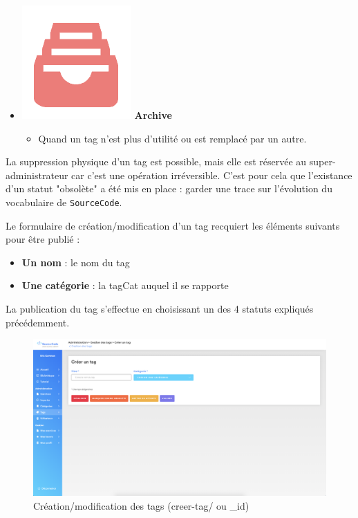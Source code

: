 \begin{itemize}
    \item \includegraphics[valign=b,height=1.4\fontcharht\font`X]{images/client/archive.png} \textbf{Archive}
    \begin{itemize}
        \item Quand un \gls{tag} n'est plus d'utilité ou est remplacé par un autre.
    \end{itemize}
\end{itemize}

La suppression physique d'un \gls{tag} est possible, mais elle est réservée au super-administrateur car c'est une opération irréversible. C'est pour cela que l'existance d'un statut "obsolète" a été mis en place : garder une trace sur l'évolution du vocabulaire de \texttt{SourceCode}.


Le formulaire de création/modification d'un \gls{tag} recquiert les éléments suivants pour être publié :

\begin{itemize}
    \item \textbf{Un nom} : le nom du \gls{tag}
    \item \textbf{Une catégorie} : la \gls{tagCat} auquel il se rapporte
\end{itemize}

La publication du \gls{tag} s'effectue en choisissant un des 4 statuts expliqués précédemment.

\begin{figure}[H]
    \includegraphics[width=\textwidth,height=\textheight,keepaspectratio]{images/client/create-tag-admin.png}
    \centering
    \caption[SourceCode : création/modification des \glspl{tag}]{Création/modification des \glspl{tag} (creer-tag/ ou \_id)}
\end{figure}

